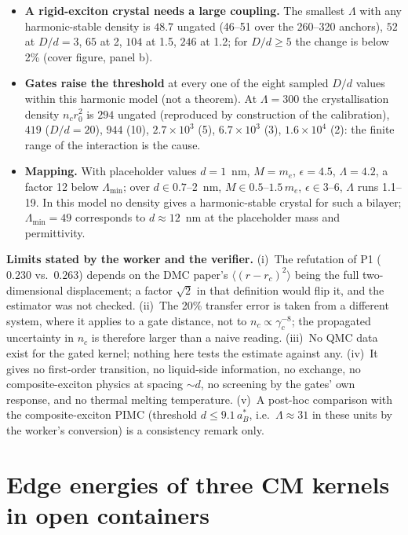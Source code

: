 \documentclass[11pt,a4paper]{article}
\begin{document}
\begin{itemize}[leftmargin=1.2em,itemsep=1pt]
\item \textbf{A rigid-exciton crystal needs a large coupling.} The smallest $\Lambda$ with any harmonic-stable density is $48.7$
ungated (46--51 over the 260--320 anchors), $52$ at $D/d=3$, $65$ at 2, $104$ at 1.5, $246$ at 1.2; for $D/d\ge5$ the change is below
2\% (cover figure, panel b).
\item \textbf{Gates raise the threshold} at every one of the eight sampled $D/d$ values within this harmonic model (not a theorem). At
$\Lambda=300$ the crystallisation density $n_cr_0^2$ is $294$ ungated (reproduced by construction of the calibration), $419$ ($D/d=20$), $944$ (10),
$2.7\times10^{3}$ (5), $6.7\times10^{3}$ (3), $1.6\times10^{4}$ (2): the finite range of the interaction is the cause.
\item \textbf{Mapping.} With placeholder values $d=1$~nm, $M=m_e$, $\epsilon=4.5$, $\Lambda=4.2$, a factor 12 below $\Lambda_{\min}$;
over $d\in0.7$--2~nm, $M\in0.5$--$1.5\,m_e$, $\epsilon\in3$--6, $\Lambda$ runs 1.1--19. In this model no density gives a harmonic-stable
crystal for such a bilayer; $\Lambda_{\min}=49$ corresponds to $d\approx12$~nm at the placeholder mass and permittivity.
\end{itemize}

\begin{failbox}
\textbf{Limits stated by the worker and the verifier.} (i)~The refutation of P1 ($0.230$ vs.\ $0.263$) depends on the DMC paper's
$\langle(r-r_c)^2\rangle$ being the full two-dimensional displacement; a factor $\sqrt2$ in that definition would flip it, and the
estimator was not checked. (ii)~The 20\% transfer error is taken from a different system, where it applies to a gate
distance, not to $n_c\propto\gamma_c^{-8}$; the propagated uncertainty in $n_c$ is therefore larger than a naive reading. (iii)~No QMC
data exist for the gated kernel; nothing here tests the estimate against any. (iv)~It gives no first-order transition, no liquid-side
information, no exchange, no composite-exciton physics at spacing $\sim d$, no screening by the gates' own response, and no thermal melting
temperature. (v)~A post-hoc comparison with the composite-exciton PIMC (threshold $d\le9.1\,a_B^{*}$, i.e.\ $\Lambda\approx31$ in these
units by the worker's conversion) is a consistency remark only.
\end{failbox}

\section{Edge energies of three CM kernels in open containers}\label{sec:edge}
\end{document}
